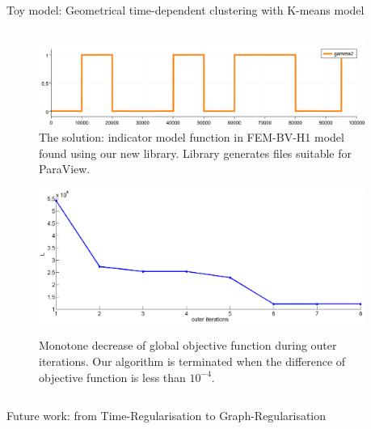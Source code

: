 \documentclass[final,hyperref={pdfpagelabels=false}]{beamer}
\begin{document}
\begin{frame}[t]
\begin{columns}[t]
\begin{column}{.48\textwidth}
\begin{block}{Toy model: Geometrical time-dependent clustering with K-means model}
\begin{columns}[T]
\begin{column}{0.46\linewidth}
\begin{figure}[H]
\begin{center}
			\includegraphics[width=1.0\linewidth, angle=0, clip = true]{figures/gamma2.png} 

			\caption{The solution: indicator model function in FEM-BV-H1 model found using our new library. 
					 Library generates files suitable for ParaView.
					 }
			\label{fig:indicator}	
		\end{center}
	\end{figure}
	\begin{figure}[H]
		\begin{center}
			\includegraphics[width=1.0\linewidth, angle=0, clip = true]{figures/L.png} \\

			\caption{Monotone decrease of global objective function during outer iterations. Our algorithm is terminated when the difference of objective function is less than $10^{-4}$.
					 }
			\label{fig:L}	
		\end{center}
	\end{figure}
\end{column}	
\begin{column}{0.02\linewidth}\end{column}
\end{columns}





\end{block}

\begin{block}{Future work: from Time-Regularisation to Graph-Regularisation} 


\end{block}
\end{column}
\end{columns}
\end{frame}
\end{document}
